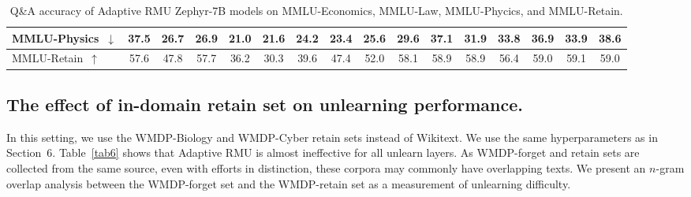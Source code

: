 \documentclass[letterpaper]{article} %
\begin{document}
\begin{table}[!ht]
{\begin{tabular}{l|c|c|c|c|c|c|c|c|c|c|c|c|c|c|c}
    MMLU-Physics~$\downarrow$   & 37.5 & 26.7 & 26.9 & 21.0 & 21.6 & 24.2 & 23.4 & 25.6 & 29.6 & 37.1 & 31.9 & 33.8 & 36.9 & 33.9 & 38.6 \\\hline
    MMLU-Retain~$\uparrow$      & 57.6 & 47.8 & 57.7 & 36.2 & 30.3 & 39.6 & 47.4 & 52.0 & 58.1 & 58.9 & 58.9 & 56.4 & 59.0 & 59.1 & 59.0 \\
    \hline
    \end{tabular}}
    \caption{Q\&A accuracy of Adaptive RMU Zephyr-7B models on MMLU-Economics, MMLU-Law, MMLU-Phycics, and MMLU-Retain.}
    \label{tab5}
\end{table}


\subsection{The effect of in-domain retain set on unlearning performance.}
In this setting, we use the WMDP-Biology and WMDP-Cyber retain sets instead of Wikitext. We use the same hyperparameters as in Section~6. Table~\ref{tab6} shows that Adaptive RMU is almost ineffective for all unlearn layers. As WMDP-forget and retain sets are collected from the same source, even with efforts in distinction, these corpora may commonly have overlapping texts. We present an $n$-gram overlap analysis between the WMDP-forget set and the WMDP-retain set as a measurement of unlearning difficulty.
\end{document}
